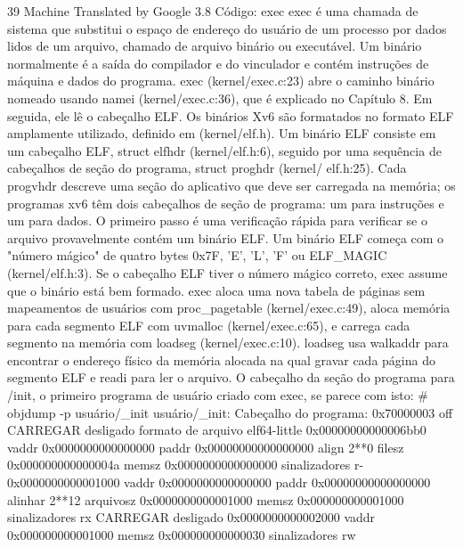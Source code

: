  39
Machine Translated by Google
 3.8  Código:  exec
 exec  é  uma  chamada  de  sistema  que  substitui  o  espaço  de  endereço  do  usuário  de  um  processo  por  dados  lidos  de  um  
arquivo,  chamado  de  arquivo  binário  ou  executável.  Um  binário  normalmente  é  a  saída  do  compilador  e  do  vinculador  e  
contém  instruções  de  máquina  e  dados  do  programa.  exec  (kernel/exec.c:23)  abre  o  caminho  binário  nomeado  usando  
namei  (kernel/exec.c:36),  que  é  explicado  no  Capítulo  8.  Em  seguida,  ele  lê  o  cabeçalho  ELF.  Os  binários  Xv6  são  
formatados  no  formato  ELF  amplamente  utilizado,  definido  em  (kernel/elf.h).  Um  binário  ELF  consiste  em  um  cabeçalho  
ELF,  struct  elfhdr  (kernel/elf.h:6),  seguido  por  uma  sequência  de  cabeçalhos  de  seção  do  programa,  struct  proghdr  (kernel/
 elf.h:25).  Cada  progvhdr  descreve  uma  seção  do  aplicativo  que  deve  ser  carregada  na  memória;  os  programas  xv6  têm  
dois  cabeçalhos  de  seção  de  programa:  um  para  instruções  e  um  para  dados.
 O  primeiro  passo  é  uma  verificação  rápida  para  verificar  se  o  arquivo  provavelmente  contém  um  binário  ELF.  Um  
binário  ELF  começa  com  o  "número  mágico"  de  quatro  bytes  0x7F,  'E',  'L',  'F'  ou  ELF_MAGIC  (kernel/elf.h:3).  Se  o  
cabeçalho  ELF  tiver  o  número  mágico  correto,  exec  assume  que  o  binário  está  bem  formado.
 exec  aloca  uma  nova  tabela  de  páginas  sem  mapeamentos  de  usuários  com  proc_pagetable  (kernel/exec.c:49),
 aloca  memória  para  cada  segmento  ELF  com  uvmalloc  (kernel/exec.c:65),  e  carrega  cada  segmento  na  memória  com  
loadseg  (kernel/exec.c:10).  loadseg  usa  walkaddr  para  encontrar  o  endereço  físico  da  memória  alocada  na  qual  gravar  
cada  página  do  segmento  ELF  e  readi  para  ler  o  arquivo.
 O  cabeçalho  da  seção  do  programa  para /init,  o  primeiro  programa  de  usuário  criado  com  exec,  se  parece  com  isto:
 #  objdump  -p  usuário/_init
 usuário/_init:
 Cabeçalho  do  programa:  
0x70000003  off
 CARREGAR  desligado
 formato  de  arquivo  elf64-little
 0x00000000000006bb0  vaddr  0x0000000000000000
 paddr  0x00000000000000000  align  2**0  filesz  0x000000000000004a  
memsz  0x0000000000000000  sinalizadores  r-
0x0000000000001000  vaddr  0x0000000000000000
 paddr  0x00000000000000000  alinhar  2**12  arquivosz  0x0000000000001000  
memsz  0x000000000001000  sinalizadores  rx
 CARREGAR  desligado
 0x0000000000002000  vaddr  0x000000000001000
 memsz  0x000000000000030  sinalizadores  rw
